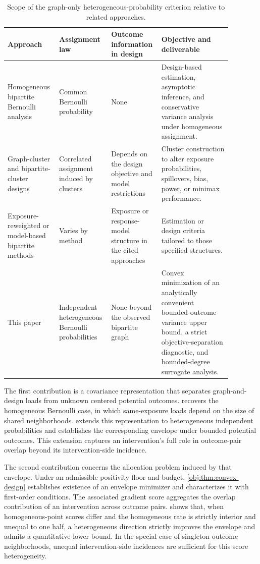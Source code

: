 \documentclass[11pt]{article}
\begin{document}
\begin{table}[t]
\centering
\small
\begin{tabular}{p{0.22\linewidth}p{0.18\linewidth}p{0.18\linewidth}p{0.30\linewidth}}
\hline
Approach & Assignment law & Outcome information in design & Objective and deliverable \\
\hline
Homogeneous bipartite Bernoulli analysis \citep{LuShiFangZhangDing2025BipartiteDesign}
& Common Bernoulli probability
& None
& Design-based estimation, asymptotic inference, and conservative variance analysis under homogeneous assignment. \\
Graph-cluster and bipartite-cluster designs \citep{UganderYin2020RandomizedGCR,BrennanMirrokniPougetAbadie2022ClusterBipartite}
& Correlated assignment induced by clusters
& Depends on the design objective and model restrictions
& Cluster construction to alter exposure probabilities, spillovers, bias, power, or minimax performance. \\
Exposure-reweighted or model-based bipartite methods \citep{HarshawSavjeEisenstatMirrokniPougetAbadie2021BipartiteERL,DoudchenkoEtAl2020BipartiteDesign}
& Varies by method
& Exposure or response-model structure in the cited approaches
& Estimation or design criteria tailored to those specified structures. \\
This paper
& Independent heterogeneous Bernoulli probabilities
& None beyond the observed bipartite graph
& Convex minimization of an analytically convenient bounded-outcome variance upper bound, a strict objective-separation diagnostic, and bounded-degree surrogate analysis. \\
\hline
\end{tabular}
\caption{Scope of the graph-only heterogeneous-probability criterion relative to related approaches.}
\end{table}

The first contribution is a covariance representation that separates graph-and-design loads from unknown centered potential outcomes.  recovers the homogeneous Bernoulli case, in which same-exposure loads depend on the size of shared neighborhoods.  extends this representation to heterogeneous independent probabilities and establishes the corresponding envelope under bounded potential outcomes. This extension captures an intervention's full role in outcome-pair overlap beyond its intervention-side incidence.

The second contribution concerns the allocation problem induced by that envelope. Under an admissible positivity floor and budget, \cref{obj:thm:convex-design} establishes existence of an envelope minimizer and characterizes it with first-order conditions. The associated gradient score aggregates the overlap contribution of an intervention across outcome pairs.  shows that, when homogeneous-point scores differ and the homogeneous rate is strictly interior and unequal to one half, a heterogeneous direction strictly improves the envelope and admits a quantitative lower bound. In the special case of singleton outcome neighborhoods, unequal intervention-side incidences are sufficient for this score heterogeneity.
\end{document}
